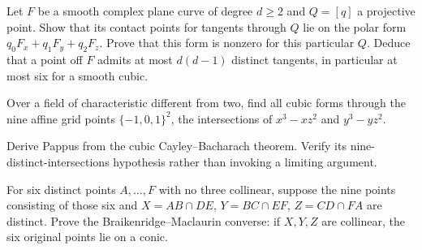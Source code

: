 \begin{exercise}[$\star\star$]\label{geometry:ex:polarcurve}
Let $F$ be a smooth complex plane curve of degree $d\ge2$ and $Q=[q]$ a projective point. Show that its contact points for tangents through $Q$ lie on the polar form $q_0F_x+q_1F_y+q_2F_z$. Prove that this form is nonzero for this particular $Q$. Deduce that a point off $F$ admits at most $d(d-1)$ distinct tangents, in particular at most six for a smooth cubic.
\end{exercise}
\begin{exercise}[$\star$]\label{geometry:ex:cramergrid}
Over a field of characteristic different from two, find all cubic forms through the nine affine grid points $\{-1,0,1\}^2$, the intersections of $x^3-xz^2$ and $y^3-yz^2$.
\end{exercise}
\begin{exercise}[$\star\star$]\label{geometry:ex:cbpappus}
Derive Pappus from the cubic Cayley--Bacharach theorem. Verify its nine-distinct-intersections hypothesis rather than invoking a limiting argument.
\end{exercise}
\begin{exercise}[$\star\star\star$]\label{geometry:ex:braikenridge}
For six distinct points $A,\ldots,F$ with no three collinear, suppose the nine points consisting of those six and $X=AB\cap DE$, $Y=BC\cap EF$, $Z=CD\cap FA$ are distinct. Prove the Braikenridge--Maclaurin converse: if $X,Y,Z$ are collinear, the six original points lie on a conic.
\end{exercise}

